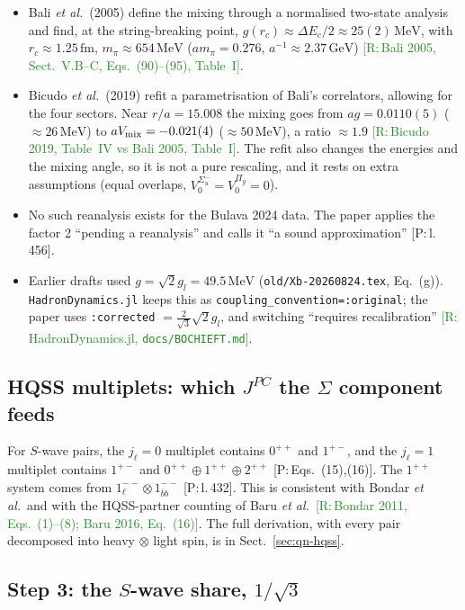 \documentclass[11pt,a4paper]{article}
\newcommand{\tagP}[1]{\textcolor{blue!65!black}{\textsf{\small[P:\,#1]}}}
\newcommand{\tagR}[1]{\textcolor{ForestGreen}{\textsf{\small[R:\,#1]}}}
\renewcommand{\GeV}{\,\mathrm{GeV}}
\renewcommand{\MeV}{\,\mathrm{MeV}}
\newcommand{\fm}{\,\mathrm{fm}}
\begin{document}
\begin{warnbox}
\begin{itemize}
\item Bali \emph{et al.}\ (2005) define the mixing through a normalised two-state analysis and find, at the string-breaking point, $g(r_c)\approx\Delta E_c/2\approx25(2)\MeV$, with $r_c\approx1.25\fm$, $m_\pi\approx654\MeV$ ($am_\pi=0.276$, $a^{-1}\approx2.37\GeV$) \tagR{Bali 2005, Sect.~V.B--C, Eqs.~(90)--(95), Table~I}.
\item Bicudo \emph{et al.}\ (2019) refit a parametrisation of Bali's correlators, allowing for the four sectors. Near $r/a=15.008$ the mixing goes from $ag=0.0110(5)$ ($\approx26\MeV$) to $aV_{\rm mix}=-0.021(4)$ ($\approx50\MeV$), a ratio $\approx1.9$ \tagR{Bicudo 2019, Table~IV vs Bali 2005, Table~I}. The refit also changes the energies and the mixing angle, so it is not a pure rescaling, and it rests on extra assumptions (equal overlaps, $V_0^{\Sigma_u^-}=V_0^{\Pi_g}=0$).
\item No such reanalysis exists for the Bulava 2024 data. The paper applies the factor 2 ``pending a reanalysis'' and calls it ``a sound approximation'' \tagP{l.\,456}.
\item Earlier drafts used $g=\sqrt2g_l=49.5\MeV$ (\texttt{old/Xb-20260824.tex}, Eq.~(g)). \texttt{HadronDynamics.jl} keeps this as \texttt{coupling\_convention=:original}; the paper uses \texttt{:corrected} $=\frac{2}{\sqrt3}\sqrt2g_l$, and switching ``requires recalibration'' \tagR{HadronDynamics.jl, \texttt{docs/BOCHIEFT.md}}.
\end{itemize}
\end{warnbox}

\subsection{HQSS multiplets: which $J^{PC}$ the $\Sigma$ component feeds}
For $S$-wave pairs, the $j_\ell=0$ multiplet contains $0^{++}$ and $1^{+-}$, and the $j_\ell=1$ multiplet contains $1^{+-}$ and $0^{++}\oplus1^{++}\oplus2^{++}$ \tagP{Eqs.~(15),(16)}. The $1^{++}$ system comes from $1_\ell^{--}\otimes1_{\bar bb}^{--}$ \tagP{l.\,432}. This is consistent with Bondar \emph{et al.}\ and with the HQSS-partner counting of Baru \emph{et al.}\ \tagR{Bondar 2011, Eqs.~(1)--(8); Baru 2016, Eq.~(16)}. The full derivation, with every pair decomposed into heavy $\otimes$ light spin, is in Sect.~\ref{sec:qn-hqss}.

\subsection{Step 3: the $S$-wave share, $1/\sqrt3$}
\end{document}

